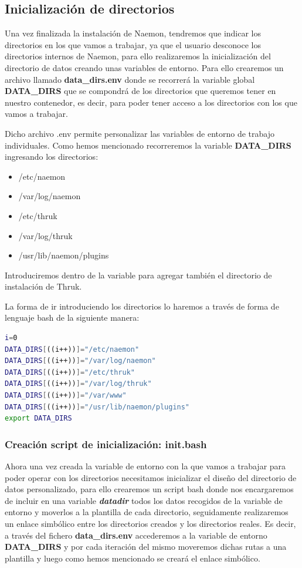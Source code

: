 \subsection{Inicialización de directorios}
Una vez finalizada la instalación de Naemon, tendremos que indicar los directorios en los que vamos a trabajar, ya que el usuario desconoce los directorios internos de Naemon, para ello realizaremos la inicialización del directorio de datos creando unas variables de entorno. 
\newpage
Para ello crearemos un archivo llamado \textbf{data\_dirs.env} donde se recorrerá la variable global \textbf{DATA\_DIRS} que se compondrá de los directorios que queremos tener en nuestro contenedor, es decir, para poder tener acceso a los directorios con los que vamos a trabajar.

Dicho archivo .env permite personalizar las variables de entorno de trabajo individuales. Como hemos mencionado recorreremos la variable  \textbf{DATA\_DIRS} ingresando los directorios:

\begin{itemize}
	\item /etc/naemon
	\item /var/log/naemon
	\item /etc/thruk
	\item /var/log/thruk
	\item /usr/lib/naemon/plugins
\end{itemize}

Introduciremos dentro de la variable para agregar también el directorio de instalación de Thruk.

La forma de ir introduciendo los directorios lo haremos a través de forma de lenguaje bash de la siguiente manera:

\begin{lstlisting}[language=bash]
i=0
DATA_DIRS[((i++))]="/etc/naemon"
DATA_DIRS[((i++))]="/var/log/naemon"
DATA_DIRS[((i++))]="/etc/thruk"
DATA_DIRS[((i++))]="/var/log/thruk"
DATA_DIRS[((i++))]="/var/www"
DATA_DIRS[((i++))]="/usr/lib/naemon/plugins"
export DATA_DIRS


\end{lstlisting}

\subsubsection{Creación script de inicialización: init.bash}
Ahora una vez creada la variable de entorno con la que vamos a trabajar para poder operar con los directorios necesitamos inicializar el diseño del directorio de datos personalizado, para ello crearemos un script bash donde nos encargaremos de incluir en una variable \textbf{\textit{datadir}} todos los datos recogidos de la variable de entorno y moverlos a la plantilla de cada directorio, seguidamente realizaremos un enlace simbólico entre los directorios creados y los directorios reales.
\newpage
Es decir, a través del fichero \textbf{data\_dirs.env} accederemos a la variable de entorno \textbf{DATA\_DIRS} y por cada iteración del mismo moveremos dichas rutas a una plantilla y luego como hemos mencionado se creará el enlace simbólico.

